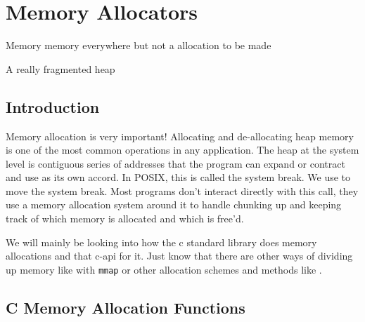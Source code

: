 \chapter{Memory Allocators}

\epigraph{Memory memory everywhere but not a allocation to be made}{A really fragmented heap}

\section{Introduction}

Memory allocation is very important!
Allocating and de-allocating heap memory is one of the most common operations in any application.
The heap at the system level is contiguous series of addresses that the program can expand or contract and use as its own accord.
In POSIX, this is called the system break.
We use  to move the system break.
Most programs don't interact directly with this call, they use a memory allocation system around it to handle chunking up and keeping track of which memory is allocated and which is free'd.

We will mainly be looking into how the c standard library does memory allocations and that c-api for it.
Just know that there are other ways of dividing up memory like with \texttt{mmap} or other allocation schemes and methods like .

\section{C Memory Allocation Functions}

